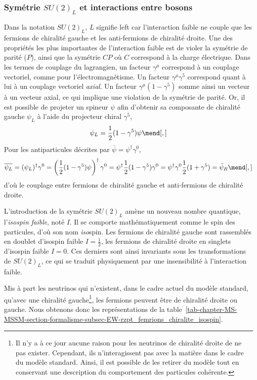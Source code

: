 \subsubsection{Symétrie $SU(2)_L$ et interactions entre bosons}\label{chapter-MS-MSSM-section-formalisme-subsec-EW-SU2}
Dans la notation $SU(2)_L$, $L$ signifie \og left \fg{} car l'interaction faible ne couple que les fermions de chiralité gauche et les anti-fermions de chiralité droite.
Une des propriétés les plus importantes de l'interaction faible est de violer la symétrie de parité ($P$), ainsi que la symétrie $CP$ où $C$ correspond à la charge électrique.
Dans les termes de couplage du lagrangien, un facteur $\gamma^\mu$ correspond à un couplage vectoriel, comme pour l'électromagnétisme. Un facteur $\gamma^\mu \gamma^5$ correspond quant à lui à un couplage vectoriel \emph{axial}. Un facteur $\gamma^\mu (1-\gamma^5)$ somme ainsi un vecteur à un vecteur axial, ce qui implique une violation de la symétrie de parité.
Or, il est possible de projeter un spineur $\psi$ afin d'obtenir sa composante de chiralité gauche $\psi_L$ à l'aide du projecteur chiral $\gamma^5$,
\begin{equation}
\psi_L = \frac{1}{2}(1-\gamma^5)\psi
\mend[,]
\end{equation}
Pour les antiparticules décrites par $\bar{\psi}=\psi^\dagger \gamma^0$,
\begin{equation}
\overline{\psi_L}
= (\psi_L)^\dagger \gamma^0
= \left(\frac{1}{2}(1-\gamma^5)\psi\right)^\dagger\gamma^0
= \psi^\dagger \frac{1}{2} (1-\gamma^5) \gamma^0
= \psi^\dagger \gamma^0 \frac{1}{2} (1+\gamma^5)
= \bar{\psi}_R
\mend[,]
\end{equation}
d'où le couplage entre fermions de chiralité gauche et anti-fermions de chiralité droite.
\par L'introduction de la symétrie $SU(2)_L$ amène un nouveau nombre quantique, l'\emph{isospin faible}, noté $I$. Il se comporte mathématiquement comme le spin des particules, d'où son nom \emph{iso}spin.
Les fermions de chiralité gauche sont rassemblés en doublet d'isospin faible $I=\frac{1}{2}$, les fermions de chiralité droite en singlets d'isospin faible $I=0$. Ces derniers sont ainsi invariants sous les transformations de $SU(2)_L$, ce qui se traduit physiquement par une insensibilité à l'interaction faible.
\par Mis à part les neutrinos qui n'existent, dans le cadre actuel du modèle standard, qu'avec une chiralité gauche\footnote{Il n'y a à ce jour aucune raison pour les neutrinos de chiralité droite de ne pas exister. Cependant, ils n'interagissent pas avec la matière dans le cadre du modèle standard. Ainsi, il est possible de les retirer du modèle tout en conservant une description du comportement des particules cohérente.}, les fermions peuvent être de chiralité droite ou gauche. Nous obtenons donc les représentations de la table~\ref{tab-chapter-MS-MSSM-section-formalisme-subsec-EW-rzpt_femrions_chiralite_isospin}.
